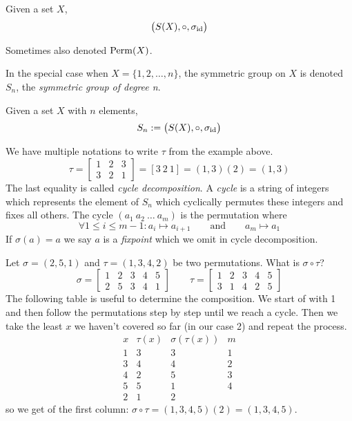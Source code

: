 \begin{definition}
   Given a set \(X\),
   \[\big(S(X), \circ, \sigma_{\operatorname{id}}\big)\]
\end{definition}
\begin{remark}[Notation]
   Sometimes also denoted \(\operatorname{Perm}(X)\).
\end{remark}

In the special case when \(X = \{1, 2, \ldots, n\}\), the symmetric group on \(X\) is denoted \(S_n\), the \emph{symmetric group of degree n}.

\begin{definition}
   Given a set \(X\) with \(n\) elements,
   \[S_n := \big(S(X), \circ, \sigma_{\operatorname{id}}\big)\]
\end{definition}
\begin{remark}[Notation]
   We have multiple notations to write \(\tau\) from the example above.
   \[\tau = \begin{bmatrix}
         1 & 2 & 3\\
         3 & 2 & 1
   \end{bmatrix} = [3~2~1] = (1,3)(2) = (1,3)\]
   The last equality is called \emph{cycle decomposition}.
   A \emph{cycle} is a string of integers which represents the element of \(S_n\) which cyclically permutes these integers and fixes all others.
   The cycle \((a_1~a_2~\ldots~a_m)\) is the permutation where
   \[\forall 1 \leq i \leq m-1: a_i \mapsto a_{i+1} \qquad\text{and}\qquad a_m \mapsto a_1\]
   If \(\sigma(a) = a\) we say \(a\) is a \emph{fixpoint} which we omit in cycle decomposition.
\end{remark}
\begin{example}
   Let \(\sigma = (2, 5, 1)\) and \(\tau = (1, 3, 4, 2)\) be two permutations.
   What is \(\sigma \circ \tau\)?
      \[\sigma = \begin{bmatrix}1&2&3&4&5\\2&5&3&4&1\end{bmatrix} \qquad \tau = \begin{bmatrix}1&2&3&4&5\\3&1&4&2&5\end{bmatrix}\]
   The following table is useful to determine the composition.
   We start of with 1 and then follow the permutations step by step until we reach a cycle.
   Then we take the least \(x\) we haven't covered so far (in our case 2) and repeat the process.
   \[\begin{array}{c|c|c|c}
         x & \tau(x) & \sigma(\tau(x)) & m \\
         \hline
         1 & 3 & 3 & 1\\
         3 & 4 & 4 & 2\\
         4 & 2 & 5 & 3\\
         5 & 5 & 1 & 4\\
         \hline
         2 & 1 & 2
      \end{array}\]
      so we get of the first column: \(\sigma \circ \tau = (1, 3, 4, 5)(2) = (1, 3, 4, 5)\).
\end{example}


